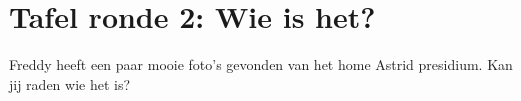 \begin{center}
\end{center}
 
\vspace{5mm}
 
 
\vspace{5mm}
 
\section{Tafel ronde 2: Wie is het?}
Freddy heeft een paar mooie foto's gevonden van het home Astrid presidium. Kan jij raden wie het is?

